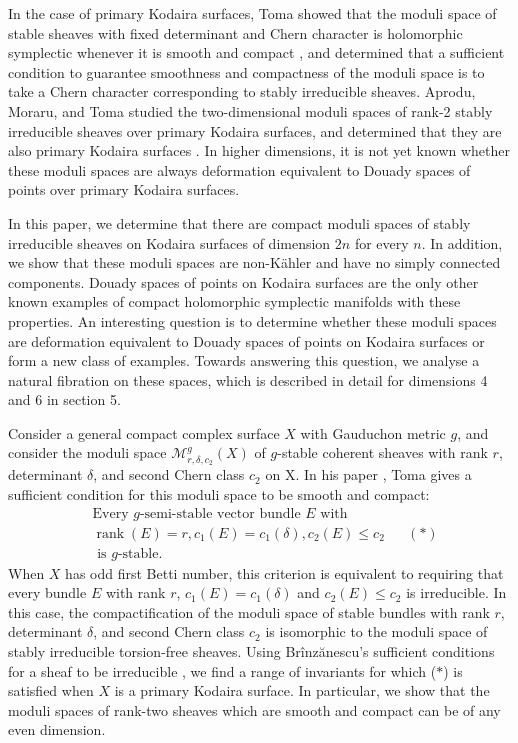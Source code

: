 \documentclass{article}[12pt]
\theoremstyle{definition}
\theoremstyle{remark}
\numberwithin{equation}{section}
\newcommand \mc{\mathcal}
\DeclareMathOperator{\rank}{rank}
\begin{document}
In the case of primary Kodaira surfaces, Toma showed that the moduli space of stable sheaves with fixed determinant and Chern character is holomorphic symplectic whenever it is smooth and compact \cite{TomaCpt}, and determined that a sufficient condition to guarantee smoothness and compactness of the moduli space is to take a Chern character corresponding to stably irreducible sheaves. Aprodu, Moraru, and Toma studied the two-dimensional moduli spaces of rank-2 stably irreducible sheaves over primary Kodaira surfaces, and determined that they are also primary Kodaira surfaces \cite{ApMorTom}. In higher dimensions, it is not yet known whether these moduli spaces are always deformation equivalent to Douady spaces of points over primary Kodaira surfaces.

In this paper, we determine that there are compact moduli spaces of stably irreducible sheaves on Kodaira surfaces of dimension $2n$ for every $n$. In addition, we show that these moduli spaces are non-K\"ahler and have no simply connected components. Douady spaces of points on Kodaira surfaces are the only other known examples of compact holomorphic symplectic manifolds with these properties. An interesting question is to determine whether these moduli spaces are deformation equivalent to Douady spaces of points on Kodaira surfaces or form a new class of examples. Towards answering this question, we analyse a natural fibration on these spaces, which is described in detail for dimensions 4 and 6 in section 5.

Consider a general compact complex surface $X$ with Gauduchon metric $g$, and consider the moduli space $\mc{M}_{r,\delta,c_2}^g(X)$ of $g$-stable coherent sheaves with rank $r$, determinant $\delta$, and second Chern class $c_2$ on X. In his paper \cite{TomaCpt}, Toma gives a sufficient condition for this moduli space to be smooth and compact: \begin{align*}&\text{Every }g\text{-semi-stable vector bundle } E \text{ with }\\ &\rank(E)=r,c_1(E)=c_1(\delta), c_2(E)\leq c_2&& (*)\\ &\text{ is }g\text{-stable.}\end{align*} 
When $X$ has odd first Betti number, this criterion is equivalent to requiring that every bundle $E$ with rank $r$, $c_1(E)=c_1(\delta)$ and $c_2(E)\leq c_2$ is irreducible. In this case, the compactification of the moduli space of stable bundles with rank $r$, determinant $\delta$, and second Chern class $c_2$ is isomorphic to the moduli space of stably irreducible torsion-free sheaves. Using Br\^inz\u anescu's sufficient conditions for a sheaf to be irreducible \cite{Brin}, we find a range of invariants for which ($*$) is satisfied when $X$ is a primary Kodaira surface. In particular, we show that the moduli spaces of rank-two sheaves which are smooth and compact can be of any even dimension.
\end{document}
